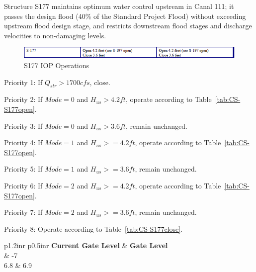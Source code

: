 Structure S177 maintains optimum water control upstream in Canal 111; it passes the design flood (40\% of the Standard Project Flood) without exceeding upstream flood design stage, and restricts downstream flood stages and discharge velocities to non-damaging levels.


\begin{figure}[!h]
  \begin{center}
  \includegraphics[width=6.5in]{../figs/S177_IOPops.png}
  \caption{S177 IOP Operations}
  \label{fig:S177iop}
  \end{center}
\end{figure}

\begin{packed_items}
\item Priority 1: If $Q_{str}>1700 cfs$, close.
\item[]
\item Priority 2: If $Mode=0$ and $H_{us}>4.2 ft$, operate according to Table~\ref{tab:CS-S177open}.
\item Priority 3: If $Mode=0$ and $H_{us}>3.6 ft$, remain unchanged.
\item[]
\item Priority 4: If $Mode=1$ and $H_{us}>=4.2 ft$, operate according to Table~\ref{tab:CS-S177open}.
\item Priority 5: If $Mode=1$ and $H_{us}>=3.6 ft$, remain unchanged.
\item[]
\item Priority 6: If $Mode=2$ and $H_{us}>=4.2 ft$, operate according to Table~\ref{tab:CS-S177open}.
\item Priority 7: If $Mode=2$ and $H_{us}>=3.6 ft$, remain unchanged.
\item[]
\item Priority 8: Operate according to Table~\ref{tab:CS-S177close}.
\end{packed_items}

\footnotesize
\begin{table}[!h]
\centering
\caption{Control strategy for S177 open (units are ft. NGVD29)}
\label{tab:CS-S177open}
\begin{tabular}{p{1.2in}{r} p{0.5in}{r}}
\hline
\textbf{Current Gate Level} & \textbf{Gate Level}\\
	& -7       \\
6.8	& 6.9   \\
\hline
\end{tabular}
\end{table}
\normalsize

